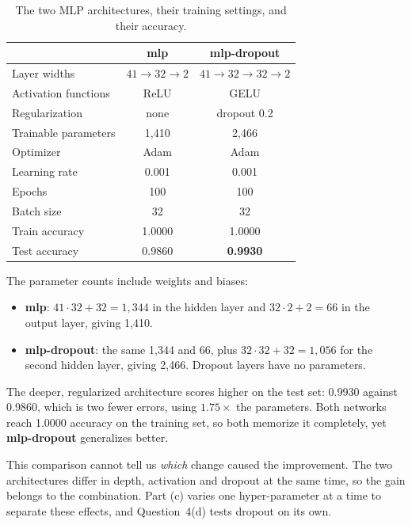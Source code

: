 \documentclass[11pt]{article}
\begin{document}
\begin{table}[H]
\centering
\caption{The two MLP architectures, their training settings, and their accuracy.}
\label{tab:q3a}
\small
\begin{tabular}{lcc}
\toprule
 & \textbf{mlp} & \textbf{mlp-dropout} \\
\midrule
Layer widths            & $41 \rightarrow 32 \rightarrow 2$ & $41 \rightarrow 32 \rightarrow 32 \rightarrow 2$ \\
Activation functions    & ReLU & GELU \\
Regularization          & none & dropout 0.2 \\
Trainable parameters    & 1{,}410 & 2{,}466 \\
Optimizer               & Adam & Adam \\
Learning rate           & 0.001 & 0.001 \\
Epochs                  & 100 & 100 \\
Batch size              & 32 & 32 \\
\midrule
Train accuracy          & 1.0000 & 1.0000 \\
Test accuracy           & 0.9860 & \textbf{0.9930} \\
\bottomrule
\end{tabular}
\end{table}

The parameter counts include weights and biases:
\begin{itemize}
    \item \textbf{mlp}: $41 \cdot 32 + 32 = 1{,}344$ in the hidden layer and $32 \cdot 2 + 2 = 66$ in the output layer, giving 1{,}410.
    \item \textbf{mlp-dropout}: the same 1{,}344 and 66, plus $32 \cdot 32 + 32 = 1{,}056$ for the second hidden layer, giving 2{,}466. Dropout layers have no parameters.
\end{itemize}


The deeper, regularized architecture scores higher on the test set: 0.9930 against 0.9860, which is two fewer errors, using $1.75\times$ the parameters. Both networks reach 1.0000 accuracy on the training set, so both memorize it completely, yet \textbf{mlp-dropout} generalizes better.

This comparison cannot tell us \emph{which} change caused the improvement. The two architectures differ in depth, activation and dropout at the same time, so the gain belongs to the combination. Part (c) varies one hyper-parameter at a time to separate these effects, and Question~4(d) tests dropout on its own.
\end{document}
